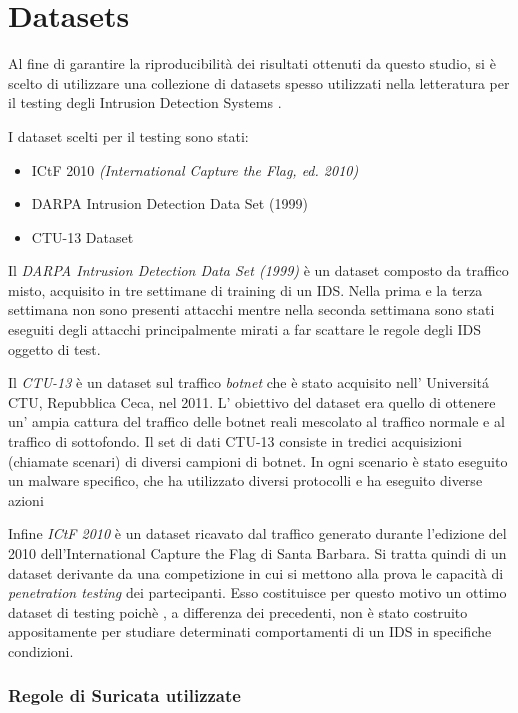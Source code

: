 \documentclass[12pt,a4paper,openright,twoside]{report}
\begin{document}
\section{Datasets}

Al fine di garantire la riproducibilit\`a dei risultati ottenuti da questo studio,
si \`e scelto di utilizzare una collezione di datasets spesso utilizzati nella letteratura
per il testing degli Intrusion Detection Systems \cite{EXP3}.

I dataset scelti per il testing sono stati:
\begin{itemize}
  \item ICtF 2010 {\it (International Capture the Flag, ed. 2010)} \cite{EXP6}
  \item DARPA Intrusion Detection Data Set (1999) \cite{EXP4}
  \item CTU-13 Dataset \cite{EXP5}
\end{itemize}

Il {\it DARPA Intrusion Detection Data Set (1999)} \`e un dataset composto da traffico misto,
 acquisito in tre settimane di training di un IDS. Nella prima e la terza settimana non
sono presenti attacchi mentre nella seconda settimana sono stati eseguiti degli attacchi
principalmente mirati a far scattare le regole degli IDS oggetto di test.

Il {\it CTU-13} \`e un dataset sul traffico {\it botnet} che \`e stato acquisito nell' Universit\'a CTU,
Repubblica Ceca, nel 2011. L' obiettivo del dataset era quello di ottenere un' ampia cattura
del traffico delle botnet reali mescolato al traffico normale e al traffico di sottofondo.
Il set di dati CTU-13 consiste in tredici acquisizioni (chiamate scenari) di diversi campioni
di botnet. In ogni scenario \`e stato eseguito un malware specifico, che ha utilizzato
diversi protocolli e ha eseguito diverse azioni

Infine {\it ICtF 2010} \`e un dataset ricavato dal traffico generato durante l'edizione del
2010 dell'International Capture the Flag di Santa Barbara. Si tratta quindi di un dataset
derivante da una competizione in cui si mettono alla prova le capacit\`a di {\it penetration
testing} dei partecipanti. Esso costituisce per questo motivo un ottimo dataset di testing poich\`e
, a differenza dei precedenti, non \`e stato
costruito appositamente per studiare determinati comportamenti di un IDS in specifiche
condizioni.

\subsubsection{Regole di Suricata utilizzate}
\end{document}
